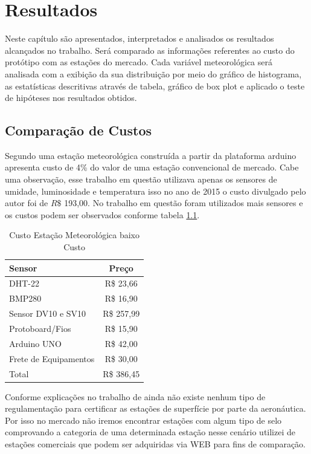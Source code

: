 \chapter{Resultados} \label{resultado}


Neste capítulo são apresentados, interpretados e analisados os resultados alcançados no trabalho. Será comparado as informações referentes ao custo do protótipo com as estações do mercado. Cada variável meteorológica será analisada com a exibição da sua distribuição por meio do gráfico de histograma, as estatísticas descritivas através de tabela, gráfico de box plot e aplicado o teste de hipóteses nos resultados obtidos.

\section{Comparação de Custos}

Segundo \cite{torres2015aquisiccao} uma estação meteorológica construída a partir da plataforma arduino apresenta custo de 4\% do valor de uma estação convencional de mercado. Cabe uma observação, esse trabalho em questão utilizava apenas os sensores de umidade, luminosidade e temperatura isso no ano de 2015 o custo divulgado pelo autor foi de $R\$$ 193,00. No trabalho em questão foram utilizados mais sensores e os custos podem ser observados conforme tabela \ref{tab:custos}.

\begin{table}[!h]
\centering
\begin{tabular}{|l|c|}
\hline
\textbf{Sensor}       & \textbf{Preço} \\ \hline
DHT-22                & R\$ 23,66      \\ \hline
BMP280                & R\$ 16,90      \\ \hline
Sensor DV10 e SV10    & R\$ 257,99     \\ \hline
Protoboard/Fios       & R\$ 15,90      \\ \hline
Arduino UNO           & R\$ 42,00      \\ \hline
Frete de Equipamentos & R\$ 30,00      \\ \hline
Total                 & R\$ 386,45     \\ \hline
\end{tabular}
\caption{Custo Estação Meteorológica baixo Custo }
\label{tab:custos}
\end{table}

Conforme explicações no trabalho de \cite{ocampo2019entraves} ainda não existe nenhum tipo de regulamentação para certificar as estações de superfície por parte da aeronáutica. Por isso no mercado não iremos encontrar estações com algum tipo de selo comprovando a categoria de uma determinada estação nesse cenário utilizei de estações comerciais que podem ser adquiridas via WEB para fins de comparação.

